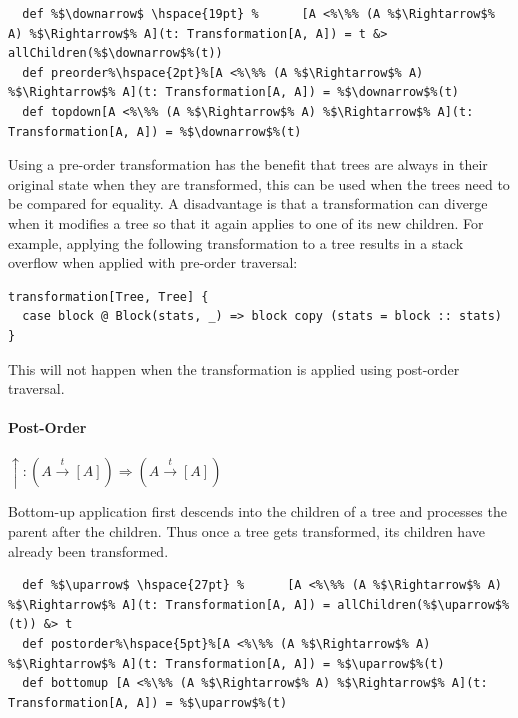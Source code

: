 \begin{lstlisting}
  def %$\downarrow$ \hspace{19pt} %      [A <%\%% (A %$\Rightarrow$% A) %$\Rightarrow$% A](t: Transformation[A, A]) = t &> allChildren(%$\downarrow$%(t))
  def preorder%\hspace{2pt}%[A <%\%% (A %$\Rightarrow$% A) %$\Rightarrow$% A](t: Transformation[A, A]) = %$\downarrow$%(t)
  def topdown[A <%\%% (A %$\Rightarrow$% A) %$\Rightarrow$% A](t: Transformation[A, A]) = %$\downarrow$%(t)
\end{lstlisting}

Using a pre-order transformation has the benefit that trees are always in their original state when they are transformed, this can be used when the trees need to be compared for equality. A disadvantage is that a transformation can diverge when it modifies a tree so that it again applies to one of its new children. For example, applying the following transformation to a tree results in a stack overflow when applied with pre-order traversal:

\begin{lstlisting}
transformation[Tree, Tree] {
  case block @ Block(stats, _) => block copy (stats = block :: stats)
}
\end{lstlisting}

This will not happen when the transformation is applied using post-order traversal.

\paragraph{Post-Order} \hfill $\uparrow: (A \overset{t}{\rightarrow} [A]) \Rightarrow (A \overset{t}{\rightarrow} [A])$

\vspace{7pt} Bottom-up application first descends into the children of a tree and processes the parent after the children. Thus once a tree gets transformed, its children have already been transformed.

\begin{lstlisting}
  def %$\uparrow$ \hspace{27pt} %      [A <%\%% (A %$\Rightarrow$% A) %$\Rightarrow$% A](t: Transformation[A, A]) = allChildren(%$\uparrow$%(t)) &> t
  def postorder%\hspace{5pt}%[A <%\%% (A %$\Rightarrow$% A) %$\Rightarrow$% A](t: Transformation[A, A]) = %$\uparrow$%(t)
  def bottomup [A <%\%% (A %$\Rightarrow$% A) %$\Rightarrow$% A](t: Transformation[A, A]) = %$\uparrow$%(t)
\end{lstlisting}

